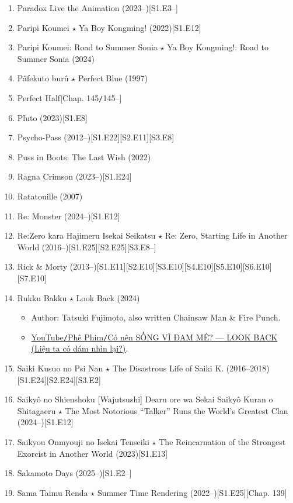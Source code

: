\documentclass{article}
\begin{document}
\begin{enumerate}
    \item Paradox Live the Animation (2023--)\hfill[S1.E3--]
    \item {\sc Paripi Koumei $\star$ Ya Boy Kongming!} (2022)\hfill[S1.E12]
    \item {\sc Paripi Koumei: Road to Summer Sonia $\star$ Ya Boy Kongming!: Road to Summer Sonia} (2024)
    \item {\sc Pâfekuto burû $\star$ Perfect Blue} (1997)
    \item Perfect Half\hfill[Chap. 145{\tt/}145--]
    \item {\sc Pluto} (2023)\hfill[S1.E8]
    \item {\sc Psycho-Pass} (2012--)\hfill[S1.E22][S2.E11][S3.E8]
    \item {\sc Puss in Boots: The Last Wish} (2022)
    \item {\sc Ragna Crimson} (2023--)\hfill[S1.E24]
    \item {\sc Ratatouille} (2007)
    \item {\sc Re: Monster} (2024--)\hfill[S1.E12]
    \item Re:Zero kara Hajimeru Isekai Seikatsu $\star$ Re: Zero, Starting Life in Another World (2016--)\hfill[S1.E25][S2.E25][S3.E8--]
    \item Rick \& Morty (2013--)\hfill[S1.E11][S2.E10][S3.E10][S4.E10][S5.E10][S6.E10][S7.E10]
    \item {\sc Rukku Bakku $\star$ Look Back} (2024)
    \begin{itemize}
    	\item Author: {\sc Tatsuki Fujimoto}, also written Chainsaw Man \& Fire Punch.
    	\item \href{https://www.youtube.com/watch?v=dw_N-6apa_w}{YouTube{\tt/}Phê Phim{\tt/}Có nên SỐNG VÌ ĐAM MÊ? — LOOK BACK (Liệu ta có dám nhìn lại?)}.
    \end{itemize}    
    \item {\sc Saiki Kusuo no Psi Nan $\star$ The Disastrous Life of Saiki K.} (2016--2018)\hfill[S1.E24][S2.E24][S3.E2]
    \item {\sc Saikyô no Shienshoku [Wajutsushi] Dearu ore wa Sekai Saikyô Kuran o Shitagaeru $\star$ The Most Notorious ``Talker'' Runs the World's Greatest Clan} (2024--)\hfill[S1.E12]
    \item {\sc Saikyou Onmyouji no Isekai Tenseiki $\star$ The Reincarnation of the Strongest Exorcist in Another World} (2023)\hfill[S1.E13]
    \item Sakamoto Days (2025--)\hfill[S1.E2--]
    \item {\sc Sama Taimu Renda $\star$ Summer Time Rendering} (2022--)\hfill[S1.E25][Chap. 139]

\end{enumerate}
\end{document}

